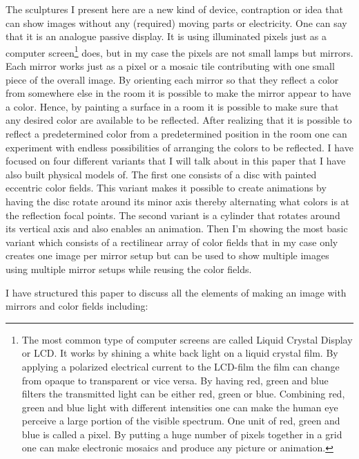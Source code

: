 \documentclass{article}
\begin{document}
The sculptures I present here are a new kind of device, contraption or
idea that can show images without any (required) moving parts or
electricity. One can say that it is an analogue passive display. It is
using illuminated pixels just as a computer screen\footnote{The most
  common type of computer screens are called Liquid Crystal Display or
  LCD. It works by shining a white back light on a liquid crystal film.
  By applying a polarized electrical current to the LCD-film the film
  can change from opaque to transparent or vice versa. By having red,
  green and blue filters the transmitted light can be either red, green
  or blue. Combining red, green and blue light with different
  intensities one can make the human eye perceive a large portion of the visible spectrum. One unit of red,
  green and blue is called a pixel. By putting a huge number of pixels
  together in a grid one can make electronic mosaics and produce any
  picture or animation.} does, but in my case the pixels are not small
lamps but mirrors. Each mirror works just as a pixel or a mosaic tile
contributing with one small piece of the overall image. By orienting
each mirror so that they reflect a color from somewhere else in the
room it is possible to make the mirror appear to have a color. Hence,
by painting a surface in a room it is possible to make sure that any
desired color are available to be reflected. After realizing that it is
possible to reflect a predetermined color from a predetermined position
in the room one can experiment with endless possibilities of arranging
the colors to be reflected. I have focused on four different variants
that I will talk about in this paper that I have also built physical
models of. The first one consists of a disc with painted eccentric
color fields. This variant makes it possible to create animations by
having the disc rotate around its minor axis thereby alternating what
colors is at the reflection focal points. The second variant is a
cylinder that rotates around its vertical axis and also enables an
animation. Then I'm showing the most basic variant which consists of a
rectilinear array of color fields that in my case only creates one
image per mirror setup but can be used to show multiple images using
multiple mirror setups while reusing the color fields.

I have structured this paper to discuss all the elements of making an
image with mirrors and color fields including:

\tableofcontents


\clearpage
\end{document}
